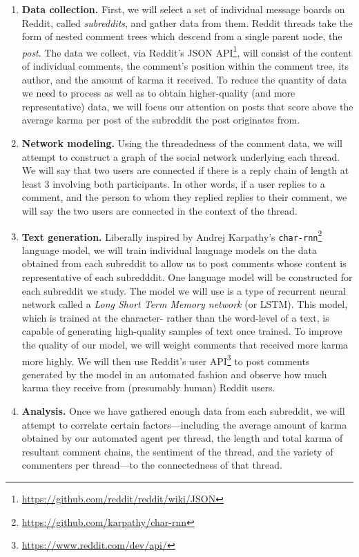 \documentclass[12pt]{article}
\begin{document}
    \begin{enumerate}
        \item \textbf{Data collection.} First, we will select a set of individual message boards on Reddit, called \textit{subreddits}, and gather data from them. Reddit threads take the form of nested comment trees which descend from a single parent node, the \textit{post}. The data we collect, via Reddit's JSON API\footnote{\url{https://github.com/reddit/reddit/wiki/JSON}}, will consist of the content of individual comments, the comment's position within the comment tree, its author, and the amount of karma it received. To reduce the quantity of data we need to process as well as to obtain higher-quality (and more representative) data, we will focus our attention on posts that score above the average karma per post of the subreddit the post originates from.
        \item \textbf{Network modeling.} Using the threadedness of the comment data, we will attempt to construct a graph of the social network underlying each thread. We will say that two users are connected if there is a reply chain of length at least 3 involving both participants. In other words, if a user replies to a comment, and the person to whom they replied replies to their comment, we will say the two users are connected in the context of the thread.
        \item \textbf{Text generation.} Liberally inspired by Andrej Karpathy's \texttt{char-rnn}\footnote{\url{https://github.com/karpathy/char-rnn}} language model, we will train individual language models on the data obtained from each subreddit to allow us to post comments whose content is representative of each subredddit. One language model will be constructed for each subreddit we study. The model we will use is a type of recurrent neural network called a \textit{Long Short Term Memory network} (or LSTM). This model, which is trained at the character- rather than the word-level of a text, is capable of generating high-quality samples of text once trained. To improve the quality of our model, we will weight comments that received more karma more highly. We will then use Reddit's user API\footnote{\url{https://www.reddit.com/dev/api/}} to post comments generated by the model in an automated fashion and observe how much karma they receive from (presumably human) Reddit users.
        \item \textbf{Analysis.} Once we have gathered enough data from each subreddit, we will attempt to correlate certain factors---including the average amount of karma obtained by our automated agent per thread, the length and total karma of resultant comment chains, the sentiment of the thread, and the variety of commenters per thread---to the connectedness of that thread.
    \end{enumerate}
		
\end{document}
